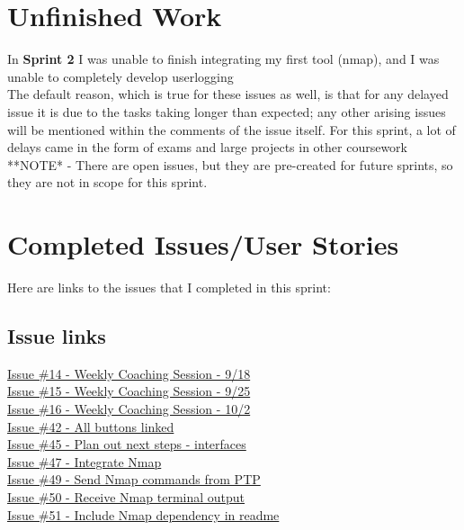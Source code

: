 \documentclass{article}
\begin{document}
\section{Unfinished Work}
\large{
In \textbf{Sprint 2} I was unable to finish integrating my first tool (nmap), and I was unable to completely develop userlogging \\
The default reason, which is true for these issues as well, is that for any delayed issue it is due to the tasks taking longer than expected; any other arising issues will be mentioned within the comments of the issue itself. For this sprint, a lot of delays came in the form of exams and large projects in other coursework \\
**NOTE* - There are open issues, but they are pre-created for future sprints, so they are not in scope for this sprint. \\
}
\newpage
\section{Completed Issues/User Stories}
Here are links to the issues that I completed in this sprint:
\subsection{Issue links}

\href{https://github.com/zachA214/Adelson_Senior_Capstone/issues/14}{Issue \#14 - Weekly Coaching Session - 9/18} \\
\href{https://github.com/zachA214/Adelson_Senior_Capstone/issues/15}{Issue \#15 - Weekly Coaching Session - 9/25} \\
\href{https://github.com/zachA214/Adelson_Senior_Capstone/issues/16}{Issue \#16 - Weekly Coaching Session - 10/2} \\
\href{https://github.com/zachA214/Adelson_Senior_Capstone/issues/42}{Issue \#42 - All buttons linked} \\
\href{https://github.com/zachA214/Adelson_Senior_Capstone/issues/45}{Issue \#45 - Plan out next steps - interfaces} \\
\href{https://github.com/zachA214/Adelson_Senior_Capstone/issues/47}{Issue \#47 - Integrate Nmap} \\
\href{https://github.com/zachA214/Adelson_Senior_Capstone/issues/49}{Issue \#49 - Send Nmap commands from PTP} \\
\href{https://github.com/zachA214/Adelson_Senior_Capstone/issues/50}{Issue \#50 - Receive Nmap terminal output} \\
\href{https://github.com/zachA214/Adelson_Senior_Capstone/issues/51}{Issue \#51 - Include Nmap dependency in readme} \\
\end{document}
